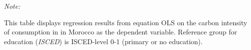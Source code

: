 \begin{table}[htbp!]
\begin{adjustbox}{width = 1\textwidth, max height = 0.95\textheight, center}
\begin{threeparttable}[b]
         \begin{tablenotes}\item \medskip \textit{Note:}
            \item This table displays regression results from equation OLS on the carbon intensity of consumption in  in Morocco as the dependent variable. Reference group for education (\textit{ISCED}) is ISCED-level 0-1 (primary or no education).
         \end{tablenotes}
      \end{threeparttable}
   \end{adjustbox}
\end{table}


